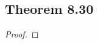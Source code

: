 \documentclass[../../main.tex]{subfiles}
\begin{document}
\subsection{Theorem 8.30}
\begin{wts}

\end{wts}
\begin{proof}

\end{proof}
\end{document}
